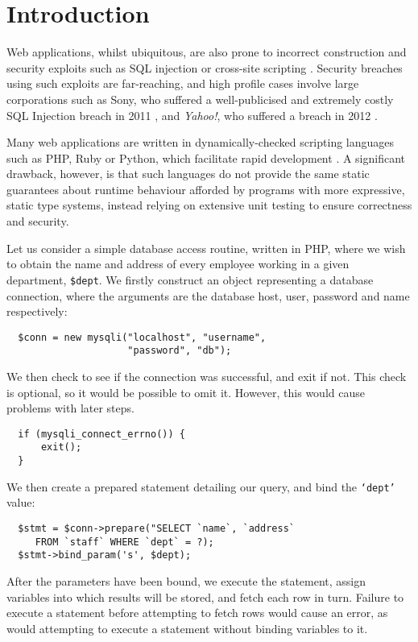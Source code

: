 \section{Introduction}

Web applications, whilst ubiquitous, are also prone to incorrect construction
and security exploits such as SQL injection \cite{owasp:sqli} or cross-site
scripting \cite{owasp:xss}. Security breaches using such exploits are
far-reaching, and high profile cases involve large corporations such as Sony,
who suffered a well-publicised and extremely costly SQL Injection breach in
2011 \cite{ieee:sony}, and \textit{Yahoo!}, who suffered a breach in 2012
\cite{imperva:yahoo}. 

Many web applications are written in dynamically-checked scripting languages
such as PHP, Ruby or Python, which facilitate rapid development
\cite{w3techs:webpls}. A significant drawback, however, is that such languages
do not provide  the same static guarantees about runtime behaviour afforded by
programs with more expressive, static type systems, instead relying on
extensive unit testing to ensure correctness and security. 

Let us consider a simple database access routine, written in
PHP, where we wish to obtain the name and address of every employee working in
a given department, \texttt{\$dept}. We firstly construct an object
representing a database connection, where the arguments are the database host,
user, password and name respectively:


%
\begin{Verbatim}
  $conn = new mysqli("localhost", "username", 
                     "password", "db");
\end{Verbatim}
%
We then check to see if the connection was successful, and exit
if not.  This check is optional, so
it would be possible to omit it. However, this would cause
problems with later steps.

%
\begin{Verbatim}
  if (mysqli_connect_errno()) {
      exit();
  }
\end{Verbatim}
%
We then create a prepared statement detailing our query, and bind the
\texttt{`dept'} value:

\begin{Verbatim}
  $stmt = $conn->prepare("SELECT `name`, `address` 
     FROM `staff` WHERE `dept` = ?);
  $stmt->bind_param('s', $dept);
\end{Verbatim}
%
After the parameters have been bound, we execute the statement, assign
variables into which results will be stored, and fetch each row in turn. 
Failure to execute a statement before attempting to fetch rows would cause an error, as would attempting to execute a statement without binding variables to it.

